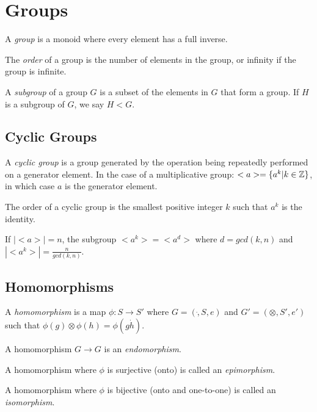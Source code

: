 \chapter{Groups}

A \emph{group} is a monoid where every element has a full inverse.

The \emph{order} of a group is the number of elements in the group, or
infinity if the group is infinite.

A \emph{subgroup} of a group $G$ is a subset of the elements in $G$
that form a group.  If $H$ is a subgroup of $G$, we say $H < G$.

\section{Cyclic Groups}

A \emph{cyclic group} is a group generated by the operation being
repeatedly performed on a generator element.  In the case of a
multiplicative group: $<a> = \{ a^k | k \in \mathbb{Z} \}$, in which case $a$
is the generator element.

The order of a cyclic group is the smallest positive integer $k$ such
that $a^k$ is the identity.

If $|<a>| = n$, the subgroup $<a^k> = <a^d>$ where $d = gcd(k,n)$ and
$|<a^k>| = \frac{n}{gcd(k,n)}$.

\section{Homomorphisms}

A \emph{homomorphism} is a map $\phi : S \rightarrow S'$ where $G =
(\dot,S,e)$ and $G' = (\otimes,S',e')$ such that $\phi(g) \otimes
\phi(h) = \phi(g \dot h)$.

A homomorphism $G \rightarrow G$ is an \emph{endomorphism}.

A homomorphism where $\phi$ is surjective (onto) is called an
\emph{epimorphism}.

A homomorphism where $\phi$ is bijective (onto and one-to-one) is
called an \emph{isomorphism}.
